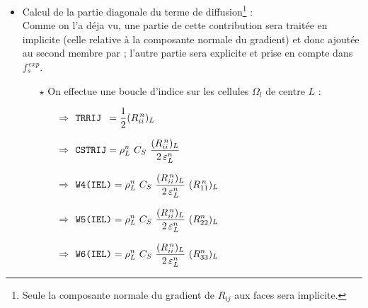 \begin{itemize}
\item Calcul de la partie diagonale du terme de diffusion\footnote{Seule la
composante normale  du  gradient de $R_{ij}$ aux faces sera implicite.} :\\
Comme on l'a d\'eja vu, une partie de cette contribution sera trait\'ee en
implicite (celle relative \`a la composante normale du gradient) et donc
ajout\'ee au second membre par  ; l'autre
partie sera explicite et prise en compte dans $f_s^{\,exp}$.
\begin{itemize}
\item [$\star$] On effectue une boucle d'indice  sur les cellules
$\Omega_l$ de centre $L$ :
\begin{itemize}
\item [$\Rightarrow$] $\displaystyle \text{\texttt{TRRIJ }}= \frac{1}{2} (R^{\,n}_{ii})_L $
\item [$\Rightarrow$] $\displaystyle \var{CSTRIJ} = \rho^n_L \ C_S \ \frac{(R^{\,n}_{ii})_L}{2\,\varepsilon^n_L}$
\item [$\Rightarrow$] $\displaystyle \var{W4(IEL)} = \rho^n_L \ C_S \
\frac{(R^{\,n}_{ii})_L}{2\,\varepsilon^n_L} \ (R^{\,n}_{11})_L$
\item [$\Rightarrow$] $\displaystyle \var{W5(IEL)} = \rho^n_L \ C_S \ \frac{(R^{\,n}_{ii})_L}{2\,\varepsilon^n_L}\ (R^n_{22})_L$
\item [$\Rightarrow$] $\displaystyle \var{W6(IEL)} = \rho^n_L \ C_S \ \frac{(R^{\,n}_{ii})_L}{2\,\varepsilon^n_L} \ (R^n_{33})_L$
\end{itemize}



\end{itemize}
\end{itemize}
